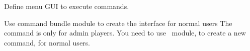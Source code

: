\label{ch:command_menu}

Define menu GUI to execute commands.



\begin{note}{Use command bundle module to create the interface for normal users}
    The  command is only for admin players.
    You need to use~ module, to create a new command, for normal users.
\end{note}